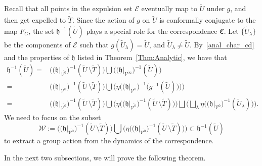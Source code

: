 \documentclass[11pt,a4paper, oneside]{amsart}
\theoremstyle{definition}
\theoremstyle{remark}
\numberwithin{equation}{section}
\def\cV{\mathcal {V}}
\def\cE{\mathcal {E}}
\newcommand{\sm}{\setminus}
\renewcommand{\tilde}{\widetilde}
\begin{document}
Recall that all points in the expulsion set $\cE$ eventually map to $\tilde U$ under $g$, and then get expelled to $\overline{\tilde T}$. Since the action of $g$ on $\tilde U$ is conformally conjugate to the map $F_G$, the set $\mathfrak{h}^{-1}(\tilde U)$ plays a special role for the correspondence $\mathfrak{C}$.
Let $\{\tilde U_\lambda\}$ be the components of $\cE$ such that $g(\tilde U_\lambda) = \tilde U$, and $\tilde U_\lambda\neq \tilde U$. By~\eqref{anal_char_cd} and the properties of $\mathfrak{h}$ listed in Theorem~\ref{Thm:Analytic}, we have that
\begin{equation*}
\begin{split}
\mathfrak{h}^{-1}(\tilde U) = &\Big(\big(\mathfrak{h}\big|_{\overline{\cV^0}}\big)^{-1}(\tilde U\,\sm\tilde T)\Big)\bigcup\Big(\big(\mathfrak{h}\big|_{\overline{\cV^\infty}}\big)^{-1}(\tilde U)\Big)\\
=&\Big(\big(\mathfrak{h}\big|_{\overline{\cV^0}}\big)^{-1}(\tilde U\,\sm\tilde T)\Big)\bigcup\Bigg(\eta\Big(\big(\mathfrak{h}\big|_{\overline{\cV^0}}\big)^{-1}\Big(g^{-1}(\tilde U)\Big)\Big)\Bigg)\\
=&\Bigg(\big(\mathfrak{h}\big|_{\overline{\cV^0}}\big)^{-1}(\tilde U\,\sm\tilde T)\Bigg)\bigcup\Bigg(\eta\Big(\big(\mathfrak{h}\big|_{\overline{\cV^0}}\big)^{-1}(\tilde U\,\sm\tilde T)\Big)\Bigg)\bigsqcup\Bigg(\bigsqcup_{\lambda} \eta\Big(\big(\mathfrak{h}\big|_{\cV^0}\big)^{-1}(\tilde U_\lambda)\Big)\Bigg).    
\end{split}    
\end{equation*}
We need to focus on the subset
\begin{equation}
\pmb{\mathcal{W}}:= \Bigg(\big(\mathfrak{h}\big|_{\overline{\cV^0}}\big)^{-1}(\tilde U\,\sm\tilde T)\Bigg)\bigcup\Bigg(\eta\Big(\big(\mathfrak{h}\big|_{\overline{\cV^0}}\big)^{-1}(\tilde U\,\sm\tilde T)\Big)\Bigg)\subset \mathfrak{h}^{-1}(\tilde U)
\label{tiling_comp_eq}
\end{equation}
to extract a group action from the dynamics of the correspondence. 


In the next two subsections, we will prove the following theorem.
 
\end{document}
